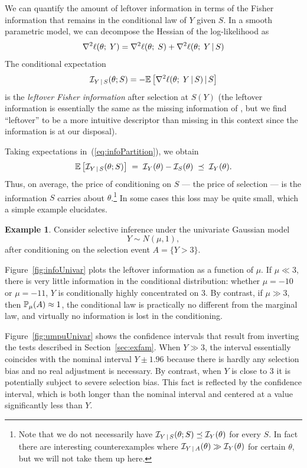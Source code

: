 \documentclass{article}
\theoremstyle{definition}
\newtheorem{example}{Example}
\newcommand{\cI}{\mathcal{I}}
\begin{document}
We can quantify the amount of leftover information in terms of the Fisher information that remains in the conditional law of $Y$ given $S$. In a smooth parametric model, we can decompose the Hessian of the log-likelihood as
\begin{equation}\label{eq:infoPartition}
  \grad^2 \ell(\theta;\;Y) = \grad^2 \ell(\theta; \;S) + \grad^2 \ell(\theta; \;Y \gv S)
\end{equation}
The conditional expectation
\begin{equation}
  \cI_{Y\gv S}(\theta; S) = -\E\left[\grad^2 \ell(\theta;\;Y \gv S) \gv S\right]
\end{equation}
is the {\em leftover Fisher information} after selection at $S(Y)$ (the leftover information is essentially the same as the missing information of \citet{orchard1972missing}, but we find ``leftover'' to be a more intuitive descriptor than missing in this context since the information is at our disposal). 

Taking expectations in~(\ref{eq:infoPartition}), we obtain
\begin{equation}
  \E\left[\cI_{Y\gv S}(\theta; S)\right] \;=\; \cI_Y(\theta) - \cI_S(\theta) \;\preceq\; \cI_Y(\theta).
\end{equation}
Thus, on average, the price of conditioning on $S$ --- the price of selection --- is the information $S$ carries about $\theta$.\footnote{Note that we do not necessarily have $\cI_{Y\gv S}(\theta; S) \preceq \cI_Y(\theta)$ for every $S$. In fact there are interesting counterexamples where $\cI_{Y\gv A}(\theta) \gg \cI_{Y}(\theta)$ for certain $\theta$, but we will not take them up here.}
 In some cases this loss may be quite small, which a simple example elucidates.



\begin{example}\label{ex:univar}
Consider selective inference under the univariate Gaussian model
\begin{equation}
  Y \sim N(\mu, 1),
\end{equation}
after conditioning on the selection event $A = \{Y > 3\}$.

Figure~\ref{fig:infoUnivar} plots the leftover information as a function of $\mu$. If $\mu\ll 3$, there is very little information in the conditional distribution: whether $\mu = -10$ or $\mu=-11$, $Y$ is conditionally highly concentrated on 3. By contrast, if $\mu \gg 3$, then $\P_\mu(A) \approx 1$, the conditional law is practically no different from the marginal law, and virtually no information is lost in the conditioning.

Figure~\ref{fig:umpuUnivar} shows the confidence intervals that result from inverting the tests described in Section~\ref{sec:exfam}. When $Y\gg 3$, the interval essentially coincides with the nominal interval $Y \pm 1.96$ because there is hardly any selection bias and no real adjustment is necessary. By contrast, when $Y$ is close to 3 it is potentially subject to severe selection bias. This fact is reflected by the confidence interval, which is both longer than the nominal interval and centered at a value significantly less than $Y$.
\end{example}
\end{document}

